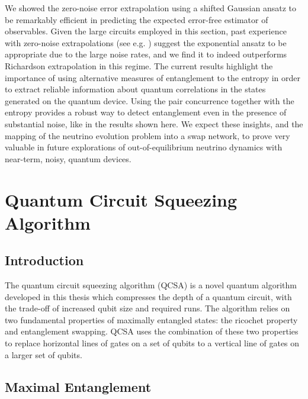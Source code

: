\documentclass[10pt]{article}
\begin{document}
We showed the zero-noise error extrapolation using a shifted Gaussian ansatz to be remarkably efficient in predicting the expected error-free estimator of observables. Given the large circuits employed in this section, past experience with zero-noise extrapolations (see e.g. \cite{roggero2020A,Roggero_nptodg}) suggest the exponential ansatz to be appropriate due to the large noise rates, and we find it to indeed outperforms Richardson extrapolation in this regime. The current results highlight the importance of using alternative measures of entanglement to the entropy in order to extract reliable information about quantum correlations in the states generated on the quantum device. Using the pair concurrence together with the entropy provides a robust way to detect entanglement even in the presence of substantial noise, like in the results shown here. We expect these insights, and the mapping of the neutrino evolution problem into a swap network, to prove very valuable in future explorations of out-of-equilibrium neutrino dynamics with near-term, noisy, quantum devices.

\chapter{Quantum Circuit Squeezing Algorithm}
\label{chap:qcsa}

\section{Introduction}

The quantum circuit squeezing algorithm (QCSA) is a novel quantum algorithm developed in this thesis which compresses the depth of a quantum circuit, with the trade-off of increased qubit size and required runs. The algorithm relies on two fundamental properties of maximally entangled states: the ricochet property and entanglement swapping. QCSA uses the combination of these two properties to replace horizontal lines of gates on a set of qubits to a vertical line of gates on a larger set of qubits.

\section{Maximal Entanglement}
\end{document}
